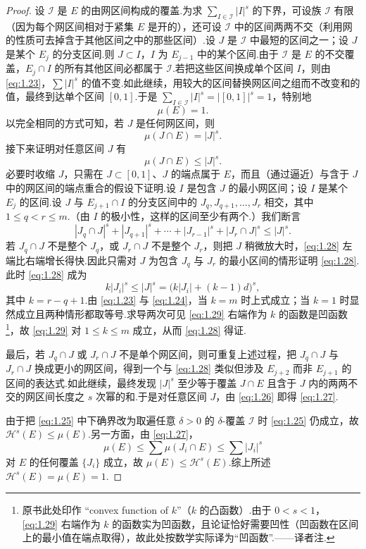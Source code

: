 \begin{proof}
设 $\mathcal{I}$ 是 $E$ 的由网区间构成的覆盖.为求 $\sum_{I\in\mathcal{I}}|I|^s$ 的下界，可设族 $\mathcal{I}$ 有限（因为每个网区间相对于紧集 $E$ 是开的），还可设 $\mathcal{I}$ 中的区间两两不交（利用网的性质可去掉含于其他区间之中的那些区间）.设 $J$ 是 $\mathcal{I}$ 中最短的区间之一；设 $J$ 是某个 $E_j$ 的分支区间.则 $J\subset I$，$I$ 为 $E_{j-1}$ 中的某个区间.由于 $\mathcal{I}$ 是 $E$ 的不交覆盖，$E_j\cap I$ 的所有其他区间必都属于 $\mathcal{I}$.若把这些区间换成单个区间 $I$，则由 \eqref{eq:1.23}，$\sum|I|^s$ 的值不变.如此继续，用较大的区间替换网区间之组而不改变和的值，最终到达单个区间 $[0,1]$.于是 $\sum_{I\in\mathcal{I}}|I|^s=|[0,1]|^s=1$，特别地
\[
  \mu(E)=1.
\]
以完全相同的方式可知，若 $J$ 是任何网区间，则
\begin{equation}\label{eq:1.26}
  \mu(J\cap E)=|J|^{s}.
\end{equation}
接下来证明对任意区间 $J$ 有
\begin{equation}\label{eq:1.27}
  \mu(J\cap E)\leq|J|^{s}.
\end{equation}
必要时收缩 $J$，只需在 $J\subset[0,1]$、$J$ 的端点属于 $E$，而且（通过逼近）与含于 $J$ 中的网区间的端点重合的假设下证明.设 $I$ 是包含 $J$ 的最小网区间；设 $I$ 是某个 $E_j$ 的区间.设 $J$ 与 $E_{j+1}\cap I$ 的分支区间中的 $J_q,J_{q+1},\ldots,J_r$ 相交，其中 $1\leq q<r\leq m$.（由 $I$ 的极小性，这样的区间至少有两个.）我们断言
\begin{equation}\label{eq:1.28}
  |J_q\cap J|^{s}+|J_{q+1}|^{s}+\cdots+|J_{r-1}|^{s}+|J_r\cap J|^{s}\leq|J|^{s}.
\end{equation}
若 $J_q\cap J$ 不是整个 $J_q$，或 $J_r\cap J$ 不是整个 $J_r$，则把 $J$ 稍微放大时，\eqref{eq:1.28} 左端比右端增长得快.因此只需对 $J$ 为包含 $J_q$ 与 $J_r$ 的最小区间的情形证明 \eqref{eq:1.28}.此时 \eqref{eq:1.28} 成为
\begin{equation}\label{eq:1.29}
  k|J_i|^{s}\leq|J|^{s}=\bigl(k|J_i|+(k-1)d\bigr)^{s},
\end{equation}
其中 $k=r-q+1$.由 \eqref{eq:1.23} 与 \eqref{eq:1.24}，当 $k=m$ 时上式成立；当 $k=1$ 时显然成立且两种情形都取等号.求导两次可见 \eqref{eq:1.29} 右端作为 $k$ 的函数是凹函数\footnote{原书此处印作 ``convex function of $k$''（$k$ 的凸函数）.由于 $0<s<1$，\eqref{eq:1.29} 右端作为 $k$ 的函数实为凹函数，且论证恰好需要凹性（凹函数在区间上的最小值在端点取得），故此处按数学实际译为``凹函数''.——译者注.}，故 \eqref{eq:1.29} 对 $1\leq k\leq m$ 成立，从而 \eqref{eq:1.28} 得证.

最后，若 $J_q\cap J$ 或 $J_r\cap J$ 不是单个网区间，则可重复上述过程，把 $J_q\cap J$ 与 $J_r\cap J$ 换成更小的网区间，得到一个与 \eqref{eq:1.28} 类似但涉及 $E_{j+2}$ 而非 $E_{j+1}$ 的区间的表达式.如此继续，最终发现 $|J|^s$ 至少等于覆盖 $J\cap E$ 且含于 $J$ 内的两两不交的网区间长度之 $s$ 次幂的和.于是对任意区间 $J$，由 \eqref{eq:1.26} 即得 \eqref{eq:1.27}.

由于把 \eqref{eq:1.25} 中下确界改为取遍任意 $\delta>0$ 的 $\delta$-覆盖 $\mathcal{I}$ 时 \eqref{eq:1.25} 仍成立，故 $\mathcal{H}^s(E)\leq\mu(E)$.另一方面，由 \eqref{eq:1.27}，
\[
  \mu(E)\leq\sum\mu(J_i\cap E)\leq\sum|J_i|^{s}
\]
对 $E$ 的任何覆盖 $\{J_i\}$ 成立，故 $\mu(E)\leq\mathcal{H}^s(E)$.综上所述 $\mathcal{H}^s(E)=\mu(E)=1$.
\end{proof}

